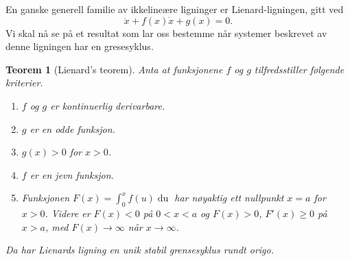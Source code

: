 \documentclass{article}
\theoremstyle{plain}
\newtheorem{teorem}{Teorem}\surroundwithmdframed{teorem}
\theoremstyle{definition}
\theoremstyle{remark}
\newcommand{\diff}[1]{\mathop{d#1}}
\begin{document}
En ganske generell familie av ikkelineære ligninger er Lienard-ligningen, gitt ved
\begin{equation} \label{eq_lienard}
    \ddot{x} + f(x) \dot{x} + g(x) = 0.
\end{equation}
Vi skal nå se på et resultat som lar oss bestemme når systemer beskrevet av denne ligningen har en gresesyklus.

\begin{teorem}[Lienard's teorem] \label{thm:lienard}
    Anta at funksjonene $f$ og $g$ tilfredsstiller følgende kriterier.
    \begin{enumerate}
        \item[(i)] $f$ og $g$ er kontinuerlig derivarbare.
        \item[(ii)] $g$ er en odde funksjon.
        \item[(iii)] $g(x) > 0$ for $x > 0$.
        \item[(iv)] $f$ er en jevn funksjon.
        \item[(v)] Funksjonen $F(x) = \int_0^x f(u) \diff{u}$ har nøyaktig ett nullpunkt $x = a$ for $x > 0$. Videre er $F(x) < 0$ på $0 < x < a$ og $F(x) > 0$, $F'(x) \geq 0$ på $x > a$, med $F(x) \rightarrow \infty$ når $x \rightarrow \infty$.
    \end{enumerate}
    Da har Lienards ligning en unik stabil grensesyklus rundt origo.
\end{teorem}
\end{document}
